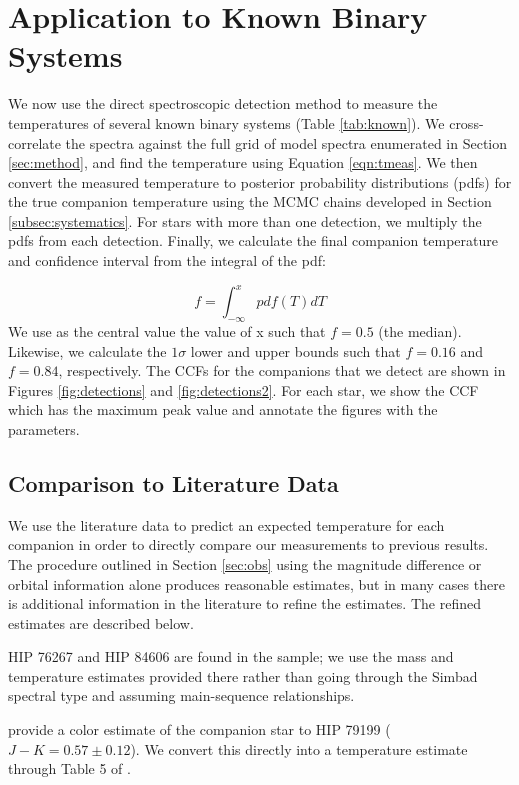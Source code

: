 \documentclass{emulateapj}
\begin{document}
\section{Application to Known Binary Systems}
\label{sec:results}

We now use the direct spectroscopic detection method to measure the temperatures of several known binary systems (Table \ref{tab:known}). We cross-correlate the spectra against the full grid of model spectra enumerated in Section \ref{sec:method}, and find the temperature using Equation \ref{eqn:tmeas}. We then convert the measured temperature to posterior probability distributions (pdfs) for the true companion temperature using the MCMC chains developed in Section \ref{subsec:systematics}. For stars with more than one detection, we multiply the pdfs from each detection. Finally, we calculate the final companion temperature and confidence interval from the integral of the pdf:

\begin{equation}
f = \int_{-\infty}^x {pdf(T)dT}
\end{equation}
We use as the central value the value of x such that $f=0.5$ (the median). Likewise, we calculate the $1 \sigma$ lower and upper bounds such that $f = 0.16$ and $f = 0.84$, respectively. The CCFs for the companions that we detect are shown in Figures \ref{fig:detections} and \ref{fig:detections2}. For each star, we show the CCF which has the maximum peak value and annotate the figures with the parameters.

\subsection{Comparison to Literature Data}
\label{subsec:expected_teffs}
We use the literature data to predict an expected temperature for each companion in order to directly compare our measurements to previous results. The procedure outlined in Section \ref{sec:obs} using the magnitude difference or orbital information alone produces reasonable estimates, but in many cases there is additional information in the literature to refine the estimates. The refined estimates are described below.

HIP 76267 and HIP 84606 are found in the \cite{David2015} sample; we use the mass and temperature estimates provided there rather than going through the Simbad spectral type and assuming main-sequence relationships.

\citet{Shatsky2002} provide a color estimate of the companion star to HIP 79199 ($J-K = 0.57 \pm 0.12$). We convert this directly into a temperature estimate through Table 5 of \citet{Pecaut2013}.
\end{document}
